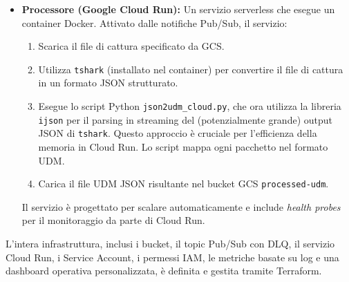 \documentclass[11pt, a4paper]{article}
\begin{document}
\begin{itemize}[leftmargin=*, label=\textbullet]
    \item \textbf{Processore (Google Cloud Run):} Un servizio serverless che esegue un container Docker. Attivato dalle notifiche Pub/Sub, il servizio:
    \begin{enumerate}
        \item Scarica il file di cattura specificato da GCS.
        \item Utilizza \texttt{tshark} (installato nel container) per convertire il file di cattura in un formato JSON strutturato.
        \item Esegue lo script Python \texttt{json2udm\_cloud.py}, che ora utilizza la libreria \texttt{ijson} per il parsing in streaming del (potenzialmente grande) output JSON di \texttt{tshark}. Questo approccio è cruciale per l'efficienza della memoria in Cloud Run. Lo script mappa ogni pacchetto nel formato UDM.
        \item Carica il file UDM JSON risultante nel bucket GCS \texttt{processed-udm}.
    \end{enumerate}
    Il servizio è progettato per scalare automaticamente e include \textit{health probes} per il monitoraggio da parte di Cloud Run.
\end{itemize}

L'intera infrastruttura, inclusi i bucket, il topic Pub/Sub con DLQ, il servizio Cloud Run, i Service Account, i permessi IAM, le metriche basate su log e una dashboard operativa personalizzata, è definita e gestita tramite Terraform.
\end{document}
